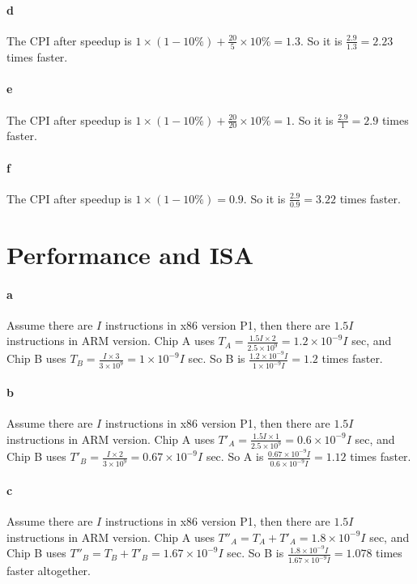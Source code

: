 \documentclass[12pt,letterpaper]{article}
\begin{document}
\paragraph*{d}
The CPI after speedup is $1\times (1-10\%) + \frac{20}{5}\times 10\% = 1.3$.
So it is $\frac{2.9}{1.3}=2.23$ times faster.

\paragraph*{e}
The CPI after speedup is $1\times (1-10\%) + \frac{20}{20}\times 10\% = 1$.
So it is $\frac{2.9}{1}=2.9$ times faster.

\paragraph*{f}
The CPI after speedup is $1\times (1-10\%) = 0.9$.
So it is $\frac{2.9}{0.9}=3.22$ times faster.

\section{Performance and ISA}
\paragraph*{a}
Assume there are $I$ instructions in x86 version P1, then there are $1.5I$ 
instructions in ARM version.
Chip A uses $T_A = \frac{1.5I \times 2}{2.5 \times 10^9} = 
1.2\times 10^{-9}I$ sec, and Chip B uses $T_B = \frac{I\times 3}{3\times10^9}
 = 1\times10^{-9}I$
sec. So B is $\frac{1.2\times 10^{-9}I}{1\times10^{-9}I} = 1.2$ times faster.

\paragraph*{b}
Assume there are $I$ instructions in x86 version P1, then there are $1.5I$ 
instructions in ARM version.
Chip A uses $T'_A = \frac{1.5I \times 1}{2.5 \times 10^9} = 
0.6\times 10^{-9}I$ sec, and Chip B uses $T'_B = \frac{I\times 2}{3\times10^9}
 = 0.67\times10^{-9}I$
sec. So A is $\frac{0.67\times 10^{-9}I}{0.6\times10^{-9}I} = 1.12$ times 
faster.

\paragraph*{c}
Assume there are $I$ instructions in x86 version P1, then there are $1.5I$ 
instructions in ARM version.
Chip A uses $T''_A =  T_A + T'_A = 1.8\times 10^{-9}I$ sec, and Chip B uses 
$T''_B = T_B + T'_B  = 1.67\times10^{-9}I$ sec. So B is $\frac{1.8\times 
10^{-9}I}{1.67\times10^{-9}I} = 1.078$ times faster altogether.
\end{document}
